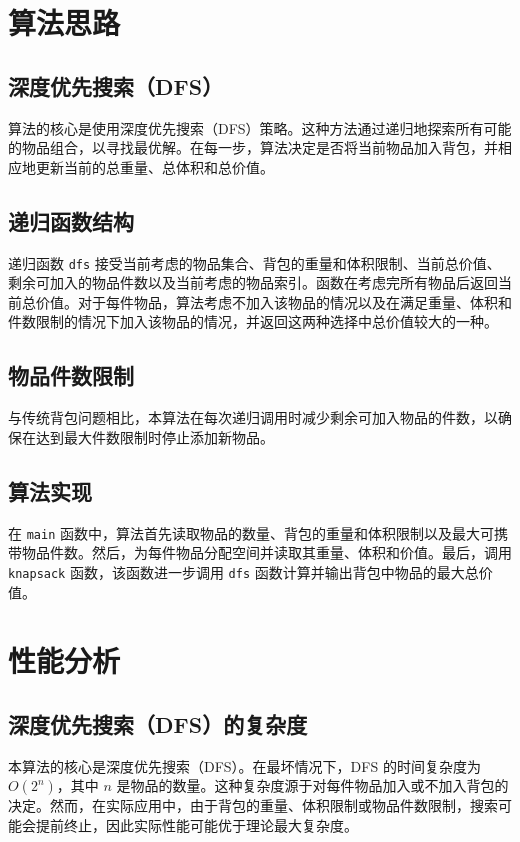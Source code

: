 \documentclass[12pt]{article}
\begin{document}
\section{算法思路}

\subsection{深度优先搜索（DFS）}
算法的核心是使用深度优先搜索（DFS）策略。这种方法通过递归地探索所有可能的物品组合，以寻找最优解。在每一步，算法决定是否将当前物品加入背包，并相应地更新当前的总重量、总体积和总价值。

\subsection{递归函数结构}
递归函数 \verb|dfs| 接受当前考虑的物品集合、背包的重量和体积限制、当前总价值、剩余可加入的物品件数以及当前考虑的物品索引。函数在考虑完所有物品后返回当前总价值。对于每件物品，算法考虑不加入该物品的情况以及在满足重量、体积和件数限制的情况下加入该物品的情况，并返回这两种选择中总价值较大的一种。

\subsection{物品件数限制}
与传统背包问题相比，本算法在每次递归调用时减少剩余可加入物品的件数，以确保在达到最大件数限制时停止添加新物品。

\subsection{算法实现}
在 \verb|main| 函数中，算法首先读取物品的数量、背包的重量和体积限制以及最大可携带物品件数。然后，为每件物品分配空间并读取其重量、体积和价值。最后，调用 \verb|knapsack| 函数，该函数进一步调用 \verb|dfs| 函数计算并输出背包中物品的最大总价值。

\newpage

\section{性能分析}

\subsection{深度优先搜索（DFS）的复杂度}
本算法的核心是深度优先搜索（DFS）。在最坏情况下，DFS 的时间复杂度为 \(O(2^n)\)，其中 \(n\) 是物品的数量。这种复杂度源于对每件物品加入或不加入背包的决定。然而，在实际应用中，由于背包的重量、体积限制或物品件数限制，搜索可能会提前终止，因此实际性能可能优于理论最大复杂度。
\end{document}
